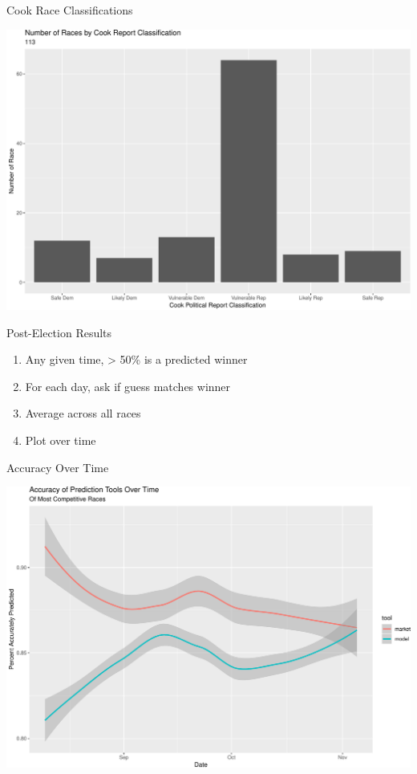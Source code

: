 \documentclass[ignorenonframetext,]{beamer}
\providecommand{\tightlist}{%
  \setlength{\itemsep}{0pt}\setlength{\parskip}{0pt}}
\begin{document}
\begin{frame}{Cook Race Classifications}

\includegraphics{markets_models_files/figure-beamer/class market-1.pdf}

\end{frame}

\begin{frame}{Post-Election Results}

\begin{enumerate}
\def\labelenumi{\arabic{enumi}.}
\tightlist
\item
  Any given time, \textgreater{} 50\% is a predicted winner
\item
  For each day, ask if guess matches winner
\item
  Average across all races
\item
  Plot over time
\end{enumerate}

\end{frame}

\begin{frame}{Accuracy Over Time}

\includegraphics{markets_models_files/figure-beamer/accuracy-1.pdf}

\end{frame}
\end{document}
